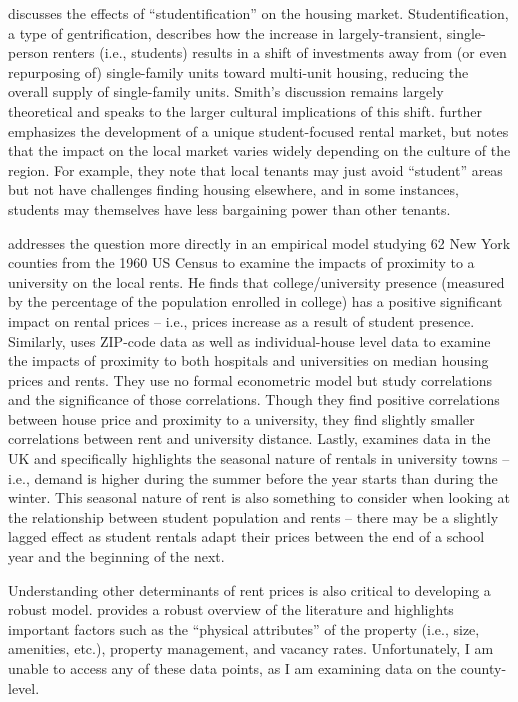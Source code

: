 \documentclass[12pt,english]{article}
\begin{document}
\citet{Smith2004} discusses the effects of “studentification” on the housing market. Studentification, a type of gentrification, describes how the increase in largely-transient, single-person renters (i.e., students) results in a shift of investments away from (or even repurposing of) single-family units toward multi-unit housing, reducing the overall supply of single-family units. Smith's discussion remains largely theoretical and speaks to the larger cultural implications of this shift. \citet{Rugg2000} further emphasizes the development of a unique student-focused rental market, but notes that the impact on the local market varies widely depending on the culture of the region. For example, they note that local tenants may just avoid “student” areas but not have challenges finding housing elsewhere, and in some instances, students may themselves have less bargaining power than other tenants.

\citet{Ogur1973} addresses the question more directly in an empirical model studying 62 New York counties from the 1960 US Census to examine the impacts of proximity to a university on the local rents. He finds that college/university presence (measured by the percentage of the population enrolled in college) has a positive significant impact on rental prices – i.e., prices increase as a result of student presence. Similarly, \citet{Rivas2019} uses ZIP-code data as well as individual-house level data to examine the impacts of proximity to both hospitals and universities on median housing prices and rents. They use no formal econometric model but study correlations and the significance of those correlations. Though they find positive correlations between house price and proximity to a university, they find slightly smaller correlations between rent and university distance. Lastly, \citet{Yilmaz2022} examines data in the UK and specifically highlights the seasonal nature of rentals in university towns – i.e., demand is higher during the summer before the year starts than during the winter. This seasonal nature of rent is also something to consider when looking at the relationship between student population and rents – there may be a slightly lagged effect as student rentals adapt their prices between the end of a school year and the beginning of the next. 
 
Understanding other determinants of rent prices is also critical to developing a robust model. \citet{Sirmans1991} provides a robust overview of the literature and highlights important factors such as the “physical attributes” of the property (i.e., size, amenities, etc.), property management, and vacancy rates. Unfortunately, I am unable to access any of these data points, as I am examining data on the county-level. 
\end{document}
